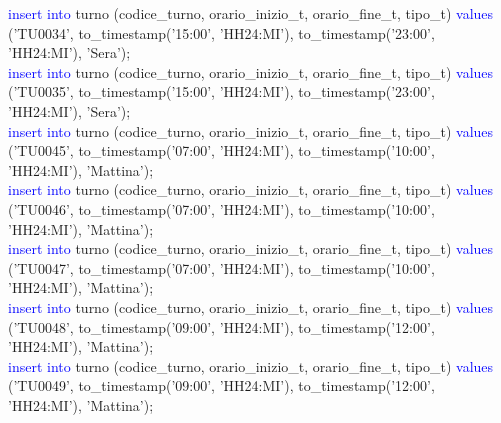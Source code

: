 \documentclass{article}
\begin{document}
\begin{flushleft}
{        \hspace*{0.5em}\textcolor{blue}{insert into} turno (codice\_turno, orario\_inizio\_t, orario\_fine\_t, tipo\_t) \textcolor{blue}{values} \hspace*{0.5em}('TU0034', to\_timestamp('15:00', 'HH24:MI'), to\_timestamp('23:00', 'HH24:MI'), \hspace*{0.5em}'Sera'); \\
        \hspace*{0.5em}\textcolor{blue}{insert into} turno (codice\_turno, orario\_inizio\_t, orario\_fine\_t, tipo\_t) \textcolor{blue}{values} \hspace*{0.5em}('TU0035', to\_timestamp('15:00', 'HH24:MI'), to\_timestamp('23:00', 'HH24:MI'), \hspace*{0.5em}'Sera'); \\
        \hspace*{0.5em}\textcolor{blue}{insert into} turno (codice\_turno, orario\_inizio\_t, orario\_fine\_t, tipo\_t) \textcolor{blue}{values} \hspace*{0.5em}('TU0045', to\_timestamp('07:00', 'HH24:MI'), to\_timestamp('10:00', 'HH24:MI'), \hspace*{0.5em}'Mattina'); \\
        \hspace*{0.5em}\textcolor{blue}{insert into} turno (codice\_turno, orario\_inizio\_t, orario\_fine\_t, tipo\_t) \textcolor{blue}{values} \hspace*{0.5em}('TU0046', to\_timestamp('07:00', 'HH24:MI'), to\_timestamp('10:00', 'HH24:MI'), \hspace*{0.5em}'Mattina'); \\
        \hspace*{0.5em}\textcolor{blue}{insert into} turno (codice\_turno, orario\_inizio\_t, orario\_fine\_t, tipo\_t) \textcolor{blue}{values} \hspace*{0.5em}('TU0047', to\_timestamp('07:00', 'HH24:MI'), to\_timestamp('10:00', 'HH24:MI'), \hspace*{0.5em}'Mattina'); \\
        \hspace*{0.5em}\textcolor{blue}{insert into} turno (codice\_turno, orario\_inizio\_t, orario\_fine\_t, tipo\_t) \textcolor{blue}{values} \hspace*{0.5em}('TU0048', to\_timestamp('09:00', 'HH24:MI'), to\_timestamp('12:00', 'HH24:MI'), \hspace*{0.5em}'Mattina'); \\
        \hspace*{0.5em}\textcolor{blue}{insert into} turno (codice\_turno, orario\_inizio\_t, orario\_fine\_t, tipo\_t) \textcolor{blue}{values} \hspace*{0.5em}('TU0049', to\_timestamp('09:00', 'HH24:MI'), to\_timestamp('12:00', 'HH24:MI'), \hspace*{0.5em}'Mattina'); \\
}
\end{flushleft}
\end{document}
